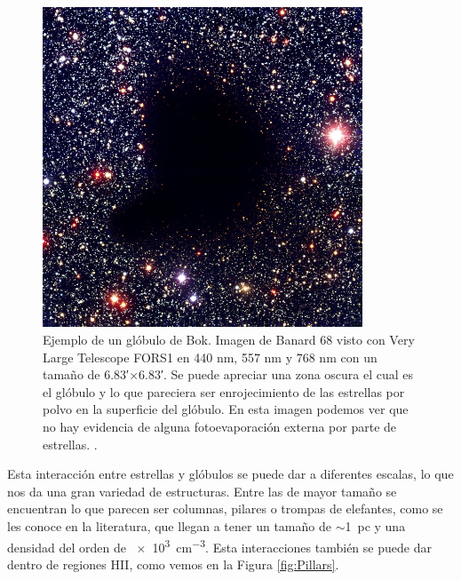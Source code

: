 \documentclass{book}
\begin{document}
\begin{figure}[htb]
    \centering
    \includegraphics[width=0.85\textwidth]{images Chapter 1/C1_Bok_globule.jpg}
    \caption{Ejemplo de un glóbulo de Bok. Imagen de Banard 68 visto
      con Very Large Telescope FORS1 en 440 nm, 557 nm y 768 nm con un
      tamaño de \ang{;6.83;}$\times$\ang{;6.83;}. Se puede apreciar una
      zona oscura el cual es el glóbulo y lo que pareciera ser
      enrojecimiento de las estrellas por polvo en la superficie del
      glóbulo. En esta imagen podemos ver que no hay evidencia de
      alguna fotoevaporación externa por parte de estrellas.
      \citep{Alves:2001}.}
    \label{fig:Banard}
\end{figure}

Esta interacción entre estrellas y glóbulos se puede dar a diferentes
escalas, lo que nos da una gran variedad de estructuras. Entre las de
mayor tamaño se encuentran lo que parecen ser columnas, pilares o
trompas de elefantes, como se les conoce en la literatura, que llegan
a tener un tamaño de $\sim$\SI{1}{pc} y una densidad del orden de
\SI{e3}{cm^{-3}}. Esta interacciones también se puede dar dentro de
regiones HII, como vemos en la Figura \ref{fig:Pillars}.
\end{document}
